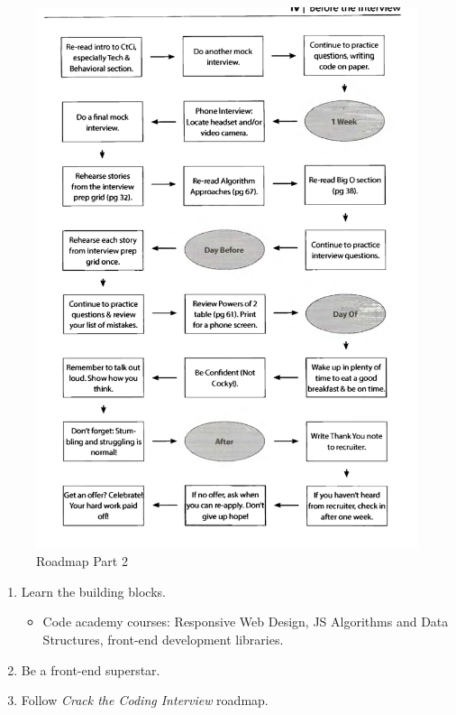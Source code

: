 \begin{figure}[H]
    \centering
    \includegraphics[width=\textwidth]{images/Roadmap 2 .png}
    \caption{Roadmap Part 2}
    \label{fig:my_label}
\end{figure}
\begin{enumerate}
    \item Learn the building blocks.
    \begin{itemize}
        \item Code academy courses: Responsive Web Design, JS Algorithms and Data Structures, front-end development libraries.
    \end{itemize}
    \item Be a front-end superstar.
    \item Follow \emph{Crack the Coding Interview} roadmap.
\end{enumerate}

